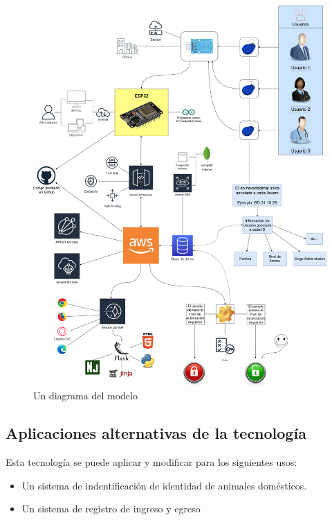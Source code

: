 \documentclass{article}
\begin{document}
\begin{figure}[H]
	\includegraphics[width=\textwidth]{../../informe/images/diagrama.drawio.png}
	\centering
	\caption{Un diagrama del modelo}
\end{figure}

\clearpage

\subsection{Aplicaciones alternativas de la tecnología}
Esta tecnología se puede aplicar y modificar para los siguientes usos:
\begin{itemize}
	\item Un sistema de indentificación de identidad de animales domésticos.
	\item Un sistema de registro de ingreso y egreso
\end{itemize}
\end{document}
